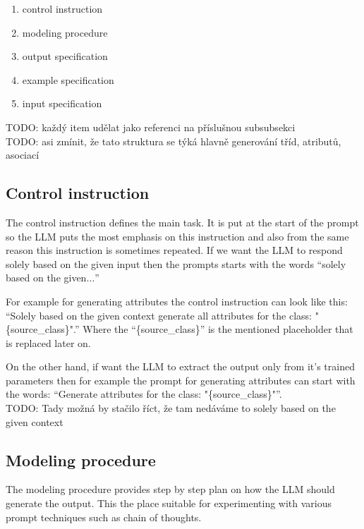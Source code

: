 \begin{enumerate}
\item control instruction
\item modeling procedure
\item output specification
\item example specification
\item input specification \\
\end{enumerate}

TODO: každý item udělat jako referenci na příslušnou subsubsekci \\

TODO: asi zmínit, že tato struktura se týká hlavně generování tříd, atributů, asociací


\subsection{Control instruction}
The control instruction defines the main task. It is put at the start of the prompt so the LLM puts the most emphasis on this instruction and also from the same reason this instruction is sometimes repeated. If we want the LLM to respond solely based on the given input then the prompts starts with the words ``solely based on the given$\ldots$''

For example for generating attributes the control instruction can look like this:
``Solely based on the given context generate all attributes for the class: "\{source\_class\}".'' Where the ``\{source\_class\}'' is the mentioned placeholder that is replaced later on.

On the other hand, if want the LLM to extract the output only from it's trained parameters then for example the prompt for generating attributes can start with the words: ``Generate attributes for the class: "\{source\_class\}"''. \\

TODO: Tady možná by stačilo říct, že tam nedáváme to solely based on the given context \\


\subsection{Modeling procedure}
The modeling procedure provides step by step plan on how the LLM should generate the output. This the place suitable for experimenting with various prompt techniques such as chain of thoughts. \\

